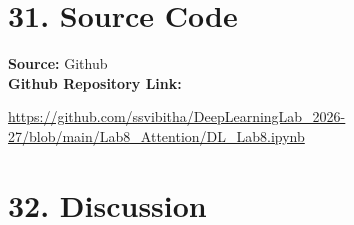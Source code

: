 \documentclass[10pt]{article}
\begin{document}
\vspace{3mm}

\section*{31. Source Code }

\noindent\textbf{Source:} Github\\
\noindent\textbf{Github Repository Link:}

\url{https://github.com/ssvibitha/DeepLearningLab_2026-27/blob/main/Lab8_Attention/DL_Lab8.ipynb}


\section*{32. Discussion}
\end{document}
